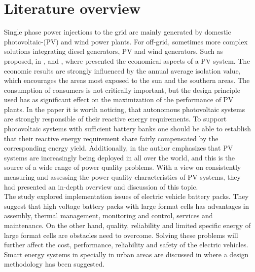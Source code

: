 \section{Literature overview}

Single phase power injections to the grid are mainly generated by domestic photovoltaic-(PV) and wind power plants. For off-grid, sometimes more complex solutions integrating diesel generators, PV and wind generators. Such as proposed, in \cite{shezan2016}, and \cite{cucchiella2013environmental}, where presented the economical aspects of a PV system. The economic results are strongly influenced by the annual average isolation value, which encourages the areas most exposed to the sun and the southern areas. The consumption of consumers is not critically important, but the design principle used has as significant effect on the maximization of the performance of PV plants. In the paper \cite{kaldellis2009optimum} it is worth noticing, that autonomous photovoltaic systems are strongly responsible of their reactive energy requirements. To support photovoltaic systems with sufficient battery banks one should be able to establish that their reactive energy requirement share fairly compensated by the corresponding energy yield.  Additionally, in \cite{ortega2013measurement} the author emphasizes that PV systems are increasingly being deployed in all over the world, and this is the source of a wide range of power quality problems. With a view on consistently measuring and assessing the power quality characteristics of PV systems, they had presented an in-depth overview and discussion of this topic.\\
 The study \cite{huat2015integration} explored implementation issues of electric vehicle battery packs. They suggest that high voltage battery packs with large format cells has advantages in assembly, thermal management, monitoring and control, services and maintenance. On the other hand, quality, reliability and limited specific energy of large format cells are obstacles need to overcome. Solving these problems will further affect the cost, performance, reliability and safety of the electric vehicles. Smart energy systems in specially in urban areas are discussed in \cite{lund2015smart} where a design methodology has been suggested.\\
